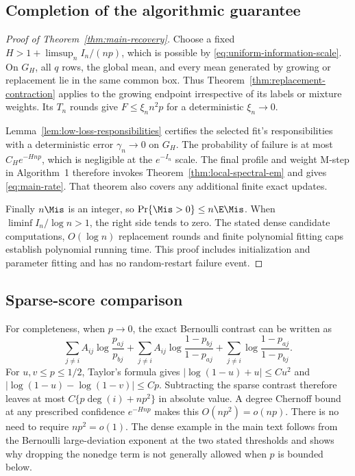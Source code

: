 \subsection{Completion of the algorithmic guarantee}
\begin{proof}[Proof of Theorem~\ref{thm:main-recovery}]
Choose a fixed $H>1+\limsup_n I_n/(np)$, which is possible by \eqref{eq:uniform-information-scale}. On $G_H$, all $q$ rows, the global mean, and every mean generated by growing or replacement lie in the same common box. Thus Theorem~\ref{thm:replacement-contraction} applies to the growing endpoint irrespective of its labels or mixture weights. Its $T_n$ rounds give $F\le\xi_n n^2p$ for a deterministic $\xi_n\to0$.

Lemma~\ref{lem:low-loss-responsibilities} certifies the selected fit's responsibilities with a deterministic error $\gamma_n\to0$ on $G_H$. The probability of failure is at most $C_He^{-Hnp}$, which is negligible at the $e^{-I_n}$ scale. The final profile and weight M-step in Algorithm~1 therefore invokes Theorem~\ref{thm:local-spectral-em} and gives \eqref{eq:main-rate}. That theorem also covers any additional finite exact updates.

Finally $n\Mis$ is an integer, so
$\Pr\{\Mis>0\}\le n\E\Mis$.
When $\liminf I_n/\log n>1$, the right side tends to zero. The stated dense candidate computations, $O(\log n)$ replacement rounds and finite polynomial fitting caps establish polynomial running time. This proof includes initialization and parameter fitting and has no random-restart failure event.
\end{proof}

\subsection{Sparse-score comparison}
For completeness, when $p\to0$, the exact Bernoulli contrast can be written as
\[
 \sum_{j\ne i}A_{ij}\log\frac{p_{aj}}{p_{bj}}
 +\sum_{j\ne i}A_{ij}\log\frac{1-p_{bj}}{1-p_{aj}}
 +\sum_{j\ne i}\log\frac{1-p_{aj}}{1-p_{bj}}.
\]
For $u,v\le p\le1/2$, Taylor's formula gives
$|\log(1-u)+u|\le Cu^2$ and
$|\log(1-u)-\log(1-v)|\le C p$.
Subtracting the sparse contrast therefore leaves at most
$C\{p\deg(i)+np^2\}$ in absolute value. A degree Chernoff bound at any prescribed confidence $e^{-Hnp}$ makes this $O(np^2)=o(np)$. There is no need to require $np^2=o(1)$. The dense example in the main text follows from the Bernoulli large-deviation exponent at the two stated thresholds and shows why dropping the nonedge term is not generally allowed when $p$ is bounded below.
